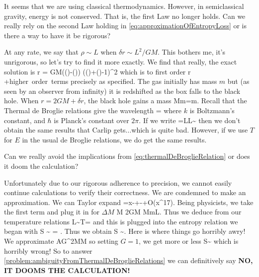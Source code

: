 \problem
It seems that we are using classical thermodynamics. However, in
semiclassical gravity, energy is not conserved. That is, the
first Law no longer holds. Can we really rely on the second Law
holding in {\sc\ref{eq:approximationOfEntropyLoss}} or is there a way
to have it be rigorous?
\endproblem

At any rate, we say that $\rho\sim L$ when $\delta r\sim
L^{2}/GM$. This bothers me, it's unrigorous, so let's try to find
it more exactly. We find that really, the exact solution is
\equation
\delta r = GM\left(\cosh \left(\right)-\sinh \left(\right)\right) \left(\sinh\left(\right)+\cosh \left(\right)-1\right)^2
\endequation
which is to first order
\equation
\delta r \approx {}+\hbox{higher order terms}
\endequation
precisely as specified. The gas initially has mass $m$ but (as
seen by an observer from infinity) it is redshifted as the box
falls to the black hole. When $r=2GM+\delta r$, the black hole
gains a mass
\equation
\Delta M\approx m=m.
\endequation
Recall that the Thermal de Broglie relations give the wavelength 
\equation\label{eq:thermalDeBroglieRelation}
\Lambda = 
\endequation
where $k$ is Boltzmann's constant, and $\hbar$ is Planck's
constant over $2\pi$. If we write
\equation
\Lambda=L\quad\iff\quad L\sim{}
\endequation
then we don't obtain the same results that Carlip gets...which is
quite bad. However, if we use $T$ for $E$ in the usual de Broglie
relations, we do get the same results. 

\problem\label{problem:ambiguityFromThermalDeBroglieRelations}
Can we really avoid the implications from \ref{eq:thermalDeBroglieRelation}
or does it doom the calculation?
\endproblem

Unfortunately due to our rigorous adherence to precision, we
cannot easily continue calculations to verify their
correctness. We are condemned to make an approximation. We can
Taylor expand
\equation
{}=x-+-+{\cal O}(x^{17}).
\endequation
Being physicists, we take the first term and plug it in for
$\Delta M$
\equation
\Delta M \approx {}\quad\Rightarrow\quad 2GM\Delta
M\approx mL.
\endequation
Thus we deduce from our temperature relations
\equation
L\sim{}\quad\Rightarrow\quad T=
\endequation
and this is plugged into the entropy relation we began with
\equation
\Delta S \sim {} = .
\endequation
Thus we obtain
\equation
\Delta S \sim {}.
\endequation
Here is where things go horribly awry! We approximate
\equation
\Delta A\approx G^{2}M\Delta M
\endequation
so setting $G=1$, we get more or less
\equation
\Delta S\sim{}
\endequation
which is horribly wrong!
So to answer \ref{problem:ambiguityFromThermalDeBroglieRelations}
we can definitively say {\bf NO, IT DOOMS THE CALCULATION!}  

